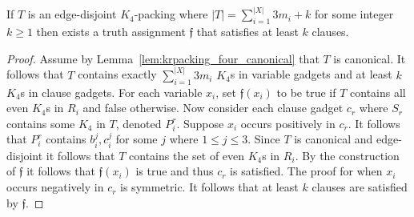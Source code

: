 \begin{lem}
\label{lem:krpacking_kfourpacking_seconddirection}
If $T$ is an edge-disjoint $K_4$-packing where $|T| = \sum_{i=1}^{|X|} 3 m_i + k$ for some integer $k\geq 1$ then exists a truth assignment $\mathfrak{f}$ that satisfies at least $k$ clauses.
\end{lem}
\begin{proof}
Assume by Lemma~\ref{lem:krpacking_four_canonical} that $T$ is canonical. It follows that $T$ contains exactly $\sum_{i=1}^{|X|} 3 m_i$ $K_4$s in variable gadgets and at least $k$ $K_4$s in clause gadgets. For each variable $x_i$, set $\mathfrak{f}(x_i)$ to be true if $T$ contains all even $K_4$s in $R_i$ and false otherwise. Now consider each clause gadget $c_r$ where $S_r$ contains some $K_4$ in $T$, denoted $P_i^r$. Suppose $x_i$ occurs positively in $c_r$. It follows that $P_i^r$ contains $b_i^j, c_i^j$ for some $j$ where $1\leq j\leq 3$. Since $T$ is canonical and edge-disjoint it follows that $T$ contains the set of even $K_4$s in $R_i$. By the construction of $\mathfrak{f}$ it follows that $\mathfrak{f}(x_i)$ is true and thus $c_r$ is satisfied. The proof for when $x_i$ occurs negatively in $c_r$ is symmetric. It follows that at least $k$ clauses are satisfied by $\mathfrak{f}$.
\end{proof}

